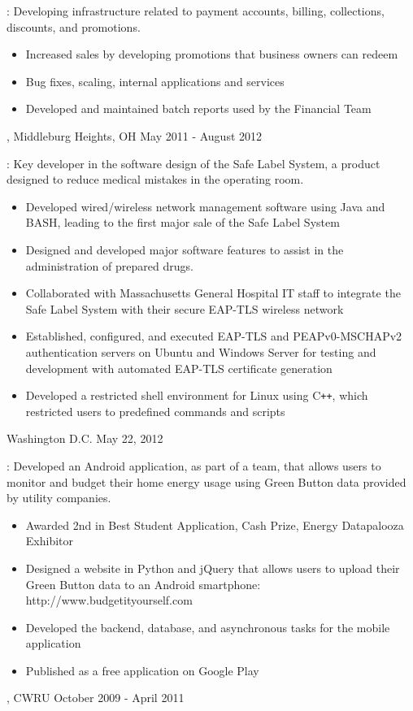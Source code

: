 \documentclass[10pt, letterpaper]{article}
\begin{document}
\hangindent=15pt
: Developing infrastructure related to payment accounts, billing, collections, discounts,  and promotions.

\begin{itemize}
\item Increased sales by developing promotions that business owners can redeem
\item Bug fixes, scaling, internal applications and services
\item Developed and maintained batch reports used by the Financial Team
\end{itemize}

\bigskip
{},  \hfill Middleburg Heights, OH \hfill May 2011 - August 2012

\hangindent=15pt
: Key developer in the software design of the Safe Label System, a product designed to reduce medical mistakes in the operating room.

\begin{itemize}
\item Developed wired/wireless network management software using Java and BASH, leading to the first major sale of the Safe Label System
\item Designed and developed major software features to assist in the administration of prepared drugs.
\item Collaborated with Massachusetts General Hospital IT staff to integrate the Safe Label System with their secure EAP-TLS wireless network
\item Established, configured, and executed EAP-TLS and PEAPv0-MSCHAPv2 authentication servers on Ubuntu and Windows Server for testing and development with automated EAP-TLS certificate generation
\item Developed a restricted shell environment for Linux using C{}\verb!++!, which restricted users to predefined commands and scripts
\end{itemize}

\bigskip
{}  \hfill Washington D.C. \hfill May 22, 2012

\hangindent=15pt
: Developed an Android application, as part of a team, that allows users to monitor and budget their home energy usage using Green Button data provided by utility companies.

\begin{itemize}
\item Awarded 2nd in Best Student Application, Cash Prize, Energy Datapalooza Exhibitor
\item Designed a website in Python and jQuery that allows users to upload their Green Button data to an Android smartphone: http://www.budgetityourself.com
\item Developed the backend, database, and asynchronous tasks for the mobile application
\item Published as a free application on Google Play
\end{itemize}
\bigskip
{},   \hfill CWRU \hfill October 2009 - April 2011
\end{document}
